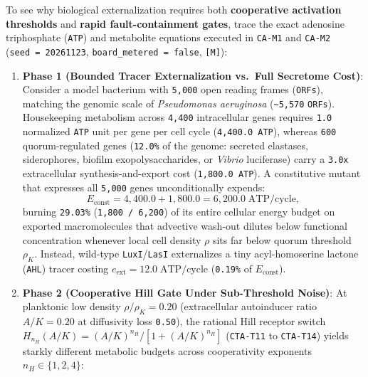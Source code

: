 \documentclass[10pt,letterpaper]{article}
\providecommand{\tightlist}{\setlength{\itemsep}{1pt}\setlength{\parskip}{0pt}}
\begin{document}
To see why biological externalization requires both \textbf{cooperative
activation thresholds} and \textbf{rapid fault-containment gates}, trace
the exact adenosine triphosphate (\texttt{ATP}) and metabolite equations
executed in \texttt{CA-M1} and \texttt{CA-M2}
(\texttt{seed\ =\ 20261123}, \texttt{board\_\allowbreak{}metered\ =\ false},
\texttt{{[}M{]}}):

\begin{enumerate}
\def\labelenumi{\arabic{enumi}.}
\tightlist
\item
  \textbf{Phase 1 (Bounded Tracer Externalization vs.~Full Secretome
  Cost)}: Consider a model bacterium with \texttt{5,000} open reading
  frames (\texttt{ORFs}), matching the genomic scale of
  \emph{Pseudomonas aeruginosa} (\texttt{\textasciitilde{}5,570}
  \texttt{ORFs}). Housekeeping metabolism across \texttt{4,400}
  intracellular genes requires \texttt{1.0} normalized \texttt{ATP} unit
  per gene per cell cycle (\texttt{4,\allowbreak{}400.\allowbreak{}0\ ATP}), whereas \texttt{600}
  quorum-regulated genes (\texttt{12.0\%} of the genome: secreted
  elastases, siderophores, biofilm exopolysaccharides, or \emph{Vibrio}
  luciferase) carry a \texttt{3.0x} extracellular synthesis-and-export
  cost (\texttt{1,\allowbreak{}800.\allowbreak{}0\ ATP}). A constitutive mutant that expresses all
  \texttt{5,000} genes unconditionally expends:
  \[E_{\text{const}} = 4{,}400.0 + 1{,}800.0 = 6{,}200.0\;\text{ATP/cycle},\]
  burning \texttt{29.03\%} (\texttt{1,\allowbreak{}800\ /\allowbreak{}\ 6,\allowbreak{}200}) of its entire
  cellular energy budget on exported macromolecules that advective
  wash-out dilutes below functional concentration whenever local cell
  density \(\rho\) sits far below quorum threshold \(\rho_K\). Instead,
  wild-type \texttt{LuxI}/\allowbreak{}\texttt{LasI} externalizes a tiny
  acyl-homoserine lactone (\texttt{AHL}) tracer costing
  \(e_{\text{ext}} = 12.0\;\text{ATP/cycle}\) (\texttt{0.19\%} of
  \(E_{\text{const}}\)).
\item
  \textbf{Phase 2 (Cooperative Hill Gate Under Sub-Threshold Noise)}: At
  planktonic low density \(\rho / \rho_K = 0.20\) (extracellular
  autoinducer ratio \(A / K = 0.20\) at diffusivity loss \texttt{0.50}),
  the rational Hill receptor switch
  \(H_{n_H}(A/K) = (A/K)^{n_H} / [1 + (A/K)^{n_H}]\) (\texttt{CTA-T11}
  to \texttt{CTA-T14}) yields starkly different metabolic budgets across
  cooperativity exponents \(n_H \in \{1, 2, 4\}\):


\end{enumerate}
\end{document}
